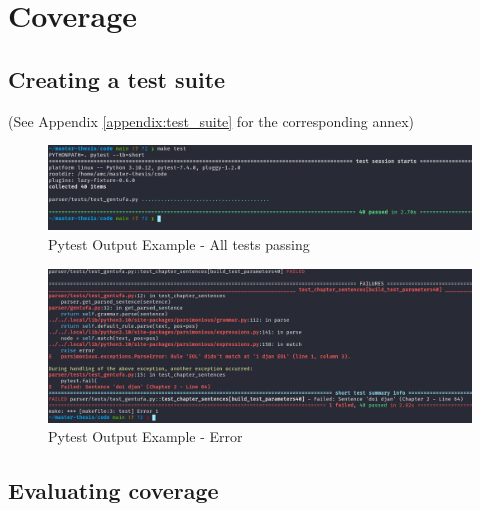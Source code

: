 \chapter{Coverage}

\section{Creating a test suite}
\label{sub:creating_a_test_suite}

(See Appendix \ref{appendix:test_suite} for the corresponding annex)



\begin{figure}[H]
\hspace{-1.1cm}
\includegraphics[scale=0.43]{images/pytest_output_pass.png}
\caption{Pytest Output Example - All tests passing}
\end{figure}

\begin{figure}[H]
\hspace{-2.2cm}
\includegraphics[scale=0.43]{images/pytest_output_fail.png}
\caption{Pytest Output Example - Error}
\end{figure}

\section{Evaluating coverage}